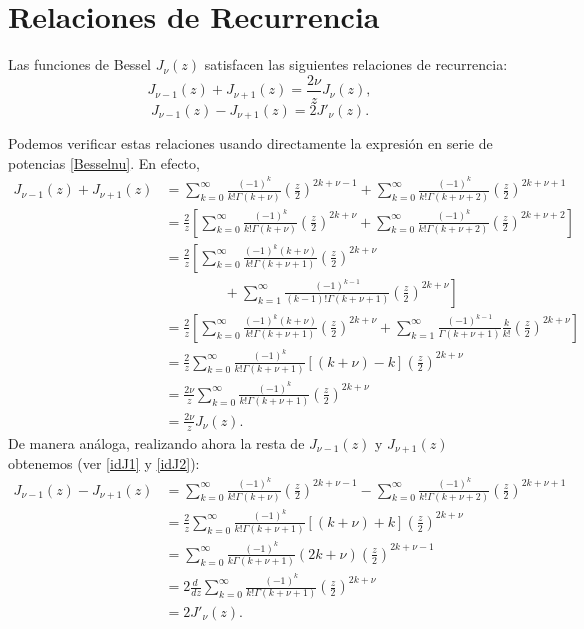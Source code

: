 \section{Relaciones de Recurrencia}
Las funciones de Bessel $J_\nu(z)$ satisfacen las siguientes relaciones de recurrencia:
\begin{equation}\label{rrJnu1}
J_{\nu-1}(z)+J_{\nu+1}(z)=\frac{2\nu}{z}J_\nu(z),
\end{equation}
\begin{equation}\label{rrJnu2}
J_{\nu-1}(z)-J_{\nu+1}(z)=2J'_\nu(z).
\end{equation}
\begin{scriptsize}
Podemos verificar estas relaciones usando directamente la expresión en serie de potencias \eqref{Besselnu}. En efecto,
\begin{align}
J_{\nu-1}(z)+J_{\nu+1}(z) &= 
\sum_{k=0}^\infty\frac{(-1)^k}{k!\Gamma(k+\nu)}\left(\frac{z}{2}\right)^{2k+\nu-1} 
+\sum_{k=0}^\infty\frac{(-1)^k}{k!\Gamma(k+\nu+2)}\left(\frac{z}{2}\right)^{2k+\nu+1} \label{idJ1}\\
&= \frac{2}{z}\left[\sum_{k=0}^\infty\frac{(-1)^k}{k!\Gamma(k+\nu)}\left(\frac{z}{2}\right)^{2k+\nu} 
+\sum_{k=0}^\infty\frac{(-1)^k}{k!\Gamma(k+\nu+2)}\left(\frac{z}{2}\right)^{2k+\nu+2}\right] \\
&= \frac{2}{z}\left[\sum_{k=0}^\infty\frac{(-1)^k(k+\nu)}{k!\Gamma(k+\nu+1)}\left(\frac{z}{2}\right)^{2k+\nu} \right. \nonumber\\
&\ \left.\qquad\qquad +\sum_{k=1}^\infty\frac{(-1)^{k-1}}{(k-1)!\Gamma(k+\nu+1)}\left(\frac{z}{2}\right)^{2k+\nu}\right] \\
&= \frac{2}{z}\left[\sum_{k=0}^\infty\frac{(-1)^k(k+\nu)}{k!\Gamma(k+\nu+1)}\left(\frac{z}{2}\right)^{2k+\nu}  +\sum_{k=1}^\infty\frac{(-1)^{k-1}}{\Gamma(k+\nu+1)}\frac{k}{k!}\left(\frac{z}{2}\right)^{2k+\nu}\right] \\
&= \frac{2}{z}\sum_{k=0}^\infty\frac{(-1)^k}{k!\Gamma(k+\nu+1)}\left[(k+\nu)-k\right]\left(\frac{z}{2}\right)^{2k+\nu} \label{idJ2}\\
&= \frac{2\nu}{z}\sum_{k=0}^\infty\frac{(-1)^k}{k!\Gamma(k+\nu+1)}\left(\frac{z}{2}\right)^{2k+\nu} \\
&= \frac{2\nu}{z}J_\nu(z).
\end{align}
De manera análoga, realizando ahora la resta de $J_{\nu-1}(z)$ y $J_{\nu+1}(z)$ obtenemos (ver \eqref{idJ1} y \eqref{idJ2}):
\begin{align}
J_{\nu-1}(z)-J_{\nu+1}(z) &= 
\sum_{k=0}^\infty\frac{(-1)^k}{k!\Gamma(k+\nu)}\left(\frac{z}{2}\right)^{2k+\nu-1} 
-\sum_{k=0}^\infty\frac{(-1)^k}{k!\Gamma(k+\nu+2)}\left(\frac{z}{2}\right)^{2k+\nu+1} \\
&= \frac{2}{z}\sum_{k=0}^\infty\frac{(-1)^k}{k!\Gamma(k+\nu+1)}\left[(k+\nu)+k\right]\left(\frac{z}{2}\right)^{2k+\nu}\\
&= \sum_{k=0}^\infty\frac{(-1)^k}{k\Gamma(k+\nu+1)}(2k+\nu)\left(\frac{z}{2}\right)^{2k+\nu-1}\\
&= 2\frac{d\ }{dz}\sum_{k=0}^\infty\frac{(-1)^k}{k!\Gamma(k+\nu+1)}\left(\frac{z}{2}\right)^{2k+\nu} \\
&= 2J'_\nu(z).
\end{align}
\end{scriptsize}


